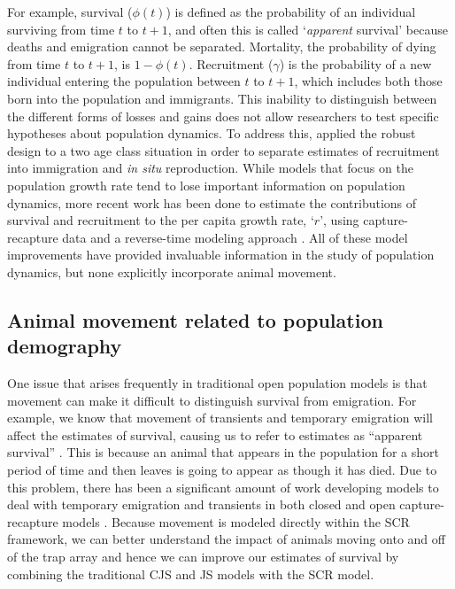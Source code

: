 For example, survival ($\phi(t)$) is defined as the probability of an
individual surviving from time $t$ to $t+1$, and often this is called
`\textit{apparent} survival' because deaths and emigration cannot be
separated. Mortality, the probability of dying from time $t$ to $t+1$,
is $1-\phi(t)$.  Recruitment ($\gamma$) is the probability of a new
individual entering the population between $t$ to $t+1$, which
includes both those born into the population and immigrants. This
inability to distinguish between the different forms of losses and
gains does not allow researchers to test specific hypotheses about
population dynamics.  To address this, \citet{nichols_pollock:1990}
applied the robust design to a two age class situation in order to
separate estimates of recruitment into immigration and {\it in situ }
reproduction.  While models that focus on the population growth rate
tend to lose important information on population dynamics, more recent
work has been done to estimate the contributions of survival and
recruitment to the per capita growth rate, `$r$', using
capture-recapture data and a reverse-time modeling approach
\citep{pradel:1996, nichols_etal:2000a}.  All of these model
improvements have provided invaluable information in the study of
population dynamics, but none explicitly incorporate animal movement.


\subsection{Animal movement related to population demography}


One issue that arises frequently in traditional open population models
is that movement can make it difficult to distinguish survival from
emigration.  For example, we know that movement of transients and
temporary emigration will affect the estimates of survival, causing us
to refer to estimates as ``apparent survival''
\citep{lebreton_etal:1992}.  This is because an animal that appears in
the population for a short period of time and then leaves is going to
appear as though it has died.  Due to this problem, there has been a
significant amount of work developing models to deal with temporary
emigration and transients in both closed and open capture-recapture
models \citep{kendall_etal:1997, pradel_hines:1997, hines_etal:2003,
  clavel_etal:2008, gilroy_etal:2012,chandler_etal:2011}.  Because
movement is modeled directly within the SCR framework, we can better
understand the impact of animals moving onto and off of the trap array
and hence we can improve our estimates of survival by combining the
traditional CJS and JS models with the SCR model.

